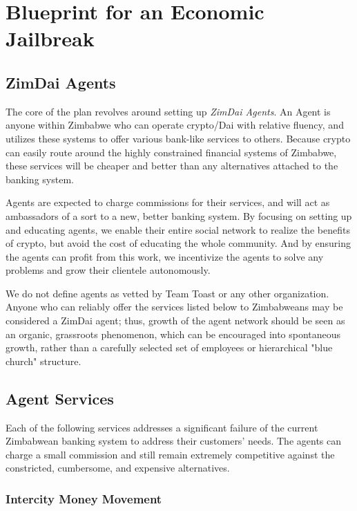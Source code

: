 \documentclass{article}
\begin{document}
\newpage
\section{Blueprint for an Economic Jailbreak}  \label{blueprint}
\subsection{ZimDai Agents} \label{agents}

The core of the plan revolves around setting up \textit{ZimDai Agents}. An Agent is anyone within Zimbabwe who can operate crypto/Dai with relative fluency, and utilizes these systems to offer various bank-like services to others. Because crypto can easily route around the highly constrained financial systems of Zimbabwe, these services will be cheaper and better than any alternatives attached to the banking system.

Agents are expected to charge commissions for their services, and will act as ambassadors of a sort to a new, better banking system. By focusing on setting up and educating agents, we enable their entire social network to realize the benefits of crypto, but avoid the cost of educating the whole community. And by ensuring the agents can profit from this work, we incentivize the agents to solve any problems and grow their clientele autonomously.

We do not define agents as vetted by Team Toast or any other organization. Anyone who can reliably offer the services listed below to Zimbabweans may be considered a ZimDai agent; thus, growth of the agent network should be seen as an organic, grassroots phenomenon, which can be encouraged into spontaneous growth, rather than a carefully selected set of employees or hierarchical "blue church" structure.

\subsection{Agent Services} \label{services}

Each of the following services addresses a significant failure of the current Zimbabwean banking system to address their customers' needs. The agents can charge a small commission and still remain extremely competitive against the constricted, cumbersome, and expensive alternatives.

\subsubsection{Intercity Money Movement} \label{intercity}
\end{document}
